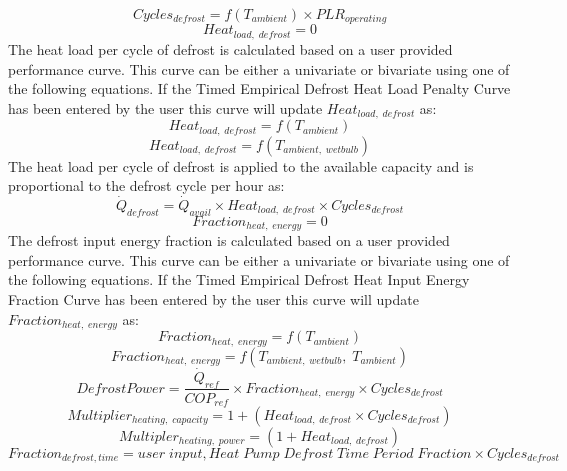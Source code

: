 \begin{equation}
{Cycles_{defrost} = f(T_{ambient})} \times PLR_{operating}
\end{equation}
\begin{equation}
Heat_{load,\; defrost} = 0
\end{equation}
The heat load per cycle of defrost is calculated based on a user provided performance curve. This curve can be either a univariate or bivariate using one of the following equations. If the Timed Empirical Defrost Heat Load Penalty Curve has been entered by the user this curve will update $Heat_{load,\; defrost}$ as:
\begin{equation}
Heat_{load,\; defrost} = f(T_{ambient})
\end{equation}
\begin{equation}
Heat_{load,\; defrost} = f(T_{ambient,\;wetbulb})
\end{equation}
The heat load per cycle of defrost is applied to the available capacity and is proportional to the defrost cycle per hour as: 
\begin{equation}
\dot{Q}_{defrost} = \dot{Q}_{avail} \times Heat_{load,\; defrost} \times Cycles_{defrost}
\end{equation}
\begin{equation}
Fraction_{heat,\; energy} = 0
\end{equation}
The defrost input energy fraction is calculated based on a user provided performance curve. This curve can be either a univariate or bivariate using one of the following equations. If the Timed Empirical Defrost Heat Input Energy Fraction Curve has been entered by the user this curve will update $Fraction_{heat,\; energy}$ as:
\begin{equation}
Fraction_{heat,\; energy} = f(T_{ambient})
\end{equation}
\begin{equation}
Fraction_{heat,\; energy} = f(T_{ambient,\;wetbulb},\;T_{ambient})
\end{equation}
\begin{equation}
DefrostPower = \frac{\dot{Q}_{ref}}{COP_{ref}} \times Fraction_{heat,\; energy} \times Cycles_{defrost}
\end{equation}
\begin{equation}
Multiplier_{heating,\; capacity} = {1 + (Heat_{load,\; defrost} \times Cycles_{defrost})}
\end{equation}
\begin{equation}
Multipler_{heating,\; power} = {(1 + Heat_{load,\; defrost})}
\end{equation}
\begin{equation}
Fraction_{defrost, time} = user\; input, Heat\; Pump\; Defrost\; Time\; Period\; Fraction \times Cycles_{defrost}
\end{equation}

